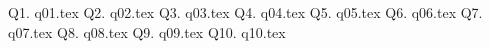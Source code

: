 

\newcommand\myincludetex[1]{\textbox{{\scriptsize \texttt{#1}}}

    
}

\newcommand\myincludesrc[1]{\textbox{{\scriptsize \texttt{#1}}}
    
    \VerbatimInput[fontsize=\footnotesize,frame=single]{#1}
}

Q1. {q01.tex}
\newpage Q2. {q02.tex}
\newpage Q3. {q03.tex}
\newpage Q4. {q04.tex}
\newpage Q5. {q05.tex}
\newpage Q6. {q06.tex}
\newpage Q7. {q07.tex}
\newpage Q8. {q08.tex}
\newpage Q9. {q09.tex}
\newpage Q10. {q10.tex}


    